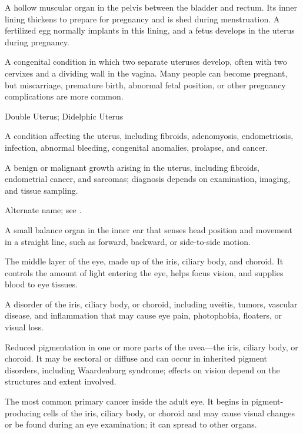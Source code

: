  A hollow muscular organ in the pelvis between the bladder and rectum. Its inner lining thickens to prepare for pregnancy and is shed during menstruation. A fertilized egg normally implants in this lining, and a fetus develops in the uterus during pregnancy.

 A congenital condition in which two separate uteruses develop, often with two cervixes and a dividing wall in the vagina. Many people can become pregnant, but miscarriage, premature birth, abnormal fetal position, or other pregnancy complications are more common.

\synonyms
Double Uterus; Didelphic Uterus

 A condition affecting the uterus, including fibroids, adenomyosis, endometriosis, infection, abnormal bleeding, congenital anomalies, prolapse, and cancer.

 A benign or malignant growth arising in the uterus, including fibroids, endometrial cancer, and sarcomas; diagnosis depends on examination, imaging, and tissue sampling.

 Alternate name; see .

 A small balance organ in the inner ear that senses head position and movement in a straight line, such as forward, backward, or side-to-side motion.

 The middle layer of the eye, made up of the iris, ciliary body, and choroid. It controls the amount of light entering the eye, helps focus vision, and supplies blood to eye tissues.

 A disorder of the iris, ciliary body, or choroid, including uveitis, tumors, vascular disease, and inflammation that may cause eye pain, photophobia, floaters, or visual loss.

 Reduced pigmentation in one or more parts of the uvea—the iris, ciliary body, or choroid. It may be sectoral or diffuse and can occur in inherited pigment disorders, including Waardenburg syndrome; effects on vision depend on the structures and extent involved.

 The most common primary cancer inside the adult eye. It begins in pigment-producing cells of the iris, ciliary body, or choroid and may cause visual changes or be found during an eye examination; it can spread to other organs.

